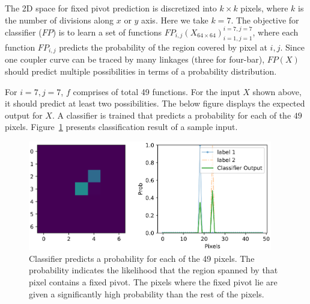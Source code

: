 The 2D space for fixed pivot prediction is discretized into $k\times k$ pixels, where $k$ is the number of divisions along $x$ or $y$ axis. Here we take $k = 7$. 
The objective for classifier ($FP$) is to learn a set of functions ${FP_{i,j}(X_{64\times 64})}_{i=1, j=1}^{i=7, j=7}$, where each function $FP_{i,j}$ predicts the probability of the region covered by pixel at ${i,j}$.
Since one coupler curve can be traced by many linkages (three for four-bar), $FP(X)$ should predict multiple possibilities in terms of a probability distribution.

For $i=7, j=7$, $f$ comprises of total 49 functions. For the input $X$ shown above, it should predict at least two possibilities. The below figure displays the expected output for $X$. A classifier is trained that predicts a probability for each of the $49$ pixels.
Figure~\ref{fig_classifier_output} presents classification result of a sample input. 

\begin{figure}
\centering
\includegraphics[width=0.95\textwidth]{idetc-20/figure/fig_classifier_output.eps}
  \caption{Classifier predicts a probability for each of the 49 pixels. The probability indicates the likelihood that the region spanned by that pixel contains a fixed pivot. The pixels where the fixed pivot lie are given a significantly high probability than the rest of the pixels.}
\label{fig_classifier_output}
\end{figure}

